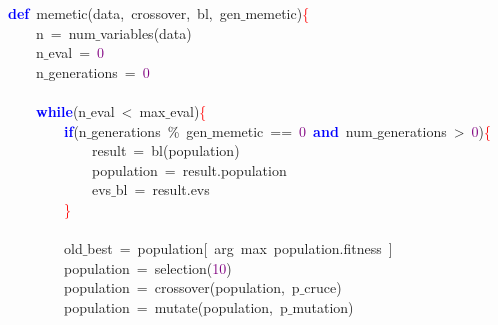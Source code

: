\noindent
\mbox{}\textbf{\textcolor{Blue}{def}}\ memetic\textcolor{BrickRed}{(}data\textcolor{BrickRed}{,}\ crossover\textcolor{BrickRed}{,}\ bl\textcolor{BrickRed}{,}\ gen$\_$memetic\textcolor{BrickRed}{)}\textcolor{Red}{\{} \\
\mbox{}\ \ \ \ n\ \textcolor{BrickRed}{=}\ num$\_$variables\textcolor{BrickRed}{(}data\textcolor{BrickRed}{)} \\
\mbox{}\ \ \ \ n$\_$eval\ \textcolor{BrickRed}{=}\ \textcolor{Purple}{0} \\
\mbox{}\ \ \ \ n$\_$generations\ \textcolor{BrickRed}{=}\ \textcolor{Purple}{0} \\
\mbox{} \\
\mbox{}\ \ \ \ \textbf{\textcolor{Blue}{while}}\textcolor{BrickRed}{(}n$\_$eval\ \textcolor{BrickRed}{\textless{}}\ max$\_$eval\textcolor{BrickRed}{)}\textcolor{Red}{\{} \\
\mbox{}\ \ \ \ \ \ \ \ \textbf{\textcolor{Blue}{if}}\textcolor{BrickRed}{(}n$\_$generations\ \textcolor{BrickRed}{\%}\ gen$\_$memetic\ \textcolor{BrickRed}{==}\ \textcolor{Purple}{0}\ \textbf{\textcolor{Blue}{and}}\ num$\_$generations\ \textcolor{BrickRed}{\textgreater{}}\ \textcolor{Purple}{0}\textcolor{BrickRed}{)}\textcolor{Red}{\{} \\
\mbox{}\ \ \ \ \ \ \ \ \ \ \ \ result\ \textcolor{BrickRed}{=}\ bl\textcolor{BrickRed}{(}population\textcolor{BrickRed}{)} \\
\mbox{}\ \ \ \ \ \ \ \ \ \ \ \ population\ \textcolor{BrickRed}{=}\ result\textcolor{BrickRed}{.}population \\
\mbox{}\ \ \ \ \ \ \ \ \ \ \ \ evs$\_$bl\ \textcolor{BrickRed}{=}\ result\textcolor{BrickRed}{.}evs \\
\mbox{}\ \ \ \ \ \ \ \ \textcolor{Red}{\}} \\
\mbox{} \\
\mbox{}\ \ \ \ \ \ \ \ old$\_$best\ \textcolor{BrickRed}{=}\ population\textcolor{BrickRed}{[}\ arg\ max\ population\textcolor{BrickRed}{.}fitness\ \textcolor{BrickRed}{]} \\
\mbox{}\ \ \ \ \ \ \ \ population\ \textcolor{BrickRed}{=}\ selection\textcolor{BrickRed}{(}\textcolor{Purple}{10}\textcolor{BrickRed}{)} \\
\mbox{}\ \ \ \ \ \ \ \ population\ \textcolor{BrickRed}{=}\ crossover\textcolor{BrickRed}{(}population\textcolor{BrickRed}{,}\ p$\_$cruce\textcolor{BrickRed}{)} \\
\mbox{}\ \ \ \ \ \ \ \ population\ \textcolor{BrickRed}{=}\ mutate\textcolor{BrickRed}{(}population\textcolor{BrickRed}{,}\ p$\_$mutation\textcolor{BrickRed}{)} \\
